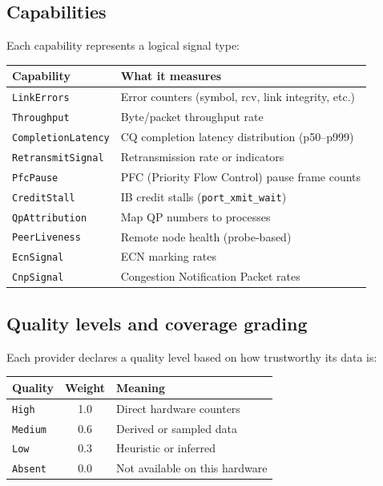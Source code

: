 \documentclass[11pt]{article}
\begin{document}
\subsection{Capabilities}

Each capability represents a logical signal type:

\begin{center}
\small
\begin{tabular}{lp{8cm}}
\toprule
Capability & What it measures \\
\midrule
\texttt{LinkErrors}        & Error counters (symbol, rcv, link integrity, etc.) \\
\texttt{Throughput}        & Byte/packet throughput rate \\
\texttt{CompletionLatency} & CQ completion latency distribution (p50--p999) \\
\texttt{RetransmitSignal}  & Retransmission rate or indicators \\
\texttt{PfcPause}          & PFC (Priority Flow Control) pause frame counts \\
\texttt{CreditStall}       & IB credit stalls (\texttt{port\_xmit\_wait}) \\
\texttt{QpAttribution}     & Map QP numbers to processes \\
\texttt{PeerLiveness}      & Remote node health (probe-based) \\
\texttt{EcnSignal}         & ECN marking rates \\
\texttt{CnpSignal}         & Congestion Notification Packet rates \\
\bottomrule
\end{tabular}
\end{center}

\subsection{Quality levels and coverage grading}

Each provider declares a quality level based on how trustworthy its data is:

\begin{center}
\begin{tabular}{lcl}
\toprule
Quality & Weight & Meaning \\
\midrule
\texttt{High}   & 1.0 & Direct hardware counters \\
\texttt{Medium} & 0.6 & Derived or sampled data \\
\texttt{Low}    & 0.3 & Heuristic or inferred \\
\texttt{Absent} & 0.0 & Not available on this hardware \\
\bottomrule
\end{tabular}
\end{center}
\end{document}
